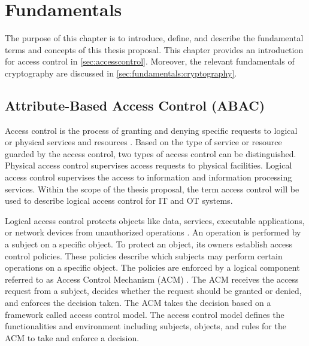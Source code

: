 \chapter{Fundamentals}
\label{ch:fundamentals}
The purpose of this chapter is to introduce, define, and describe the fundamental terms and concepts of this thesis proposal.
This chapter provides an introduction for access control in \autoref{sec:accesscontrol}.
Moreover, the relevant fundamentals of cryptography are discussed in \autoref{sec:fundamentals:cryptography}.

\section{Attribute-Based Access Control (ABAC)}
\label{sec:accesscontrol}
Access control is the process of granting and denying specific requests to logical or physical services and resources \cite{NIST2022}.
Based on the type of service or resource guarded by the access control, two types of access control can be distinguished.
Physical access control supervises access requests to physical facilities.
Logical access control supervises the access to information and information processing services.
Within the scope of the thesis proposal, the term access control will be used to describe logical access control for IT and OT systems.

Logical access control protects objects like data, services, executable applications, or network devices from unauthorized operations \cite{Hu2014}.
An operation is performed by a subject on a specific object.
To protect an object, its owners establish access control policies.
These policies describe which subjects may perform certain operations on a specific object.
The policies are enforced by a logical component referred to as Access Control Mechanism (ACM) \cite{Hu2014}.
The ACM receives the access request from a subject, decides whether the request should be granted or denied, and enforces the decision taken.
The ACM takes the decision based on a framework called access control model.
The access control model defines the functionalities and environment including subjects, objects, and rules for the ACM to take and enforce a decision.

